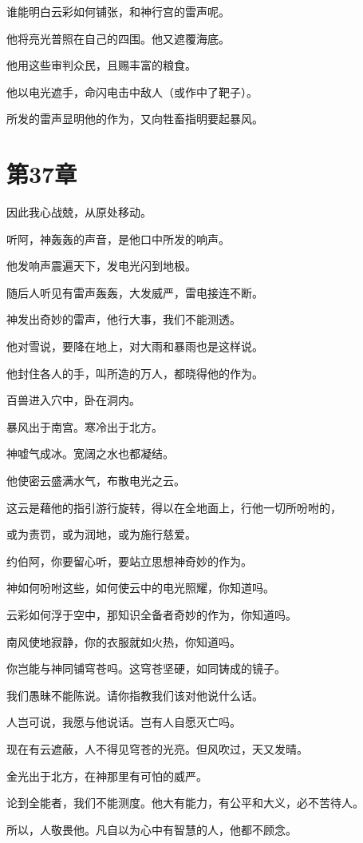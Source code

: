 \documentclass[12pt,oneside]{book}
\begin{document}
谁能明白云彩如何铺张，和神行宫的雷声呢。

他将亮光普照在自己的四围。他又遮覆海底。

他用这些审判众民，且赐丰富的粮食。

他以电光遮手，命闪电击中敌人（或作中了靶子）。

所发的雷声显明他的作为，又向牲畜指明要起暴风。


\chapter{第37章}
因此我心战兢，从原处移动。

听阿，神轰轰的声音，是他口中所发的响声。

他发响声震遍天下，发电光闪到地极。

随后人听见有雷声轰轰，大发威严，雷电接连不断。

神发出奇妙的雷声，他行大事，我们不能测透。

他对雪说，要降在地上，对大雨和暴雨也是这样说。

他封住各人的手，叫所造的万人，都晓得他的作为。

百兽进入穴中，卧在洞内。

暴风出于南宫。寒冷出于北方。

神嘘气成冰。宽阔之水也都凝结。

他使密云盛满水气，布散电光之云。

这云是藉他的指引游行旋转，得以在全地面上，行他一切所吩咐的，

或为责罚，或为润地，或为施行慈爱。

约伯阿，你要留心听，要站立思想神奇妙的作为。

神如何吩咐这些，如何使云中的电光照耀，你知道吗。

云彩如何浮于空中，那知识全备者奇妙的作为，你知道吗。

南风使地寂静，你的衣服就如火热，你知道吗。

你岂能与神同铺穹苍吗。这穹苍坚硬，如同铸成的镜子。

我们愚昧不能陈说。请你指教我们该对他说什么话。

人岂可说，我愿与他说话。岂有人自愿灭亡吗。

现在有云遮蔽，人不得见穹苍的光亮。但风吹过，天又发晴。

金光出于北方，在神那里有可怕的威严。

论到全能者，我们不能测度。他大有能力，有公平和大义，必不苦待人。

所以，人敬畏他。凡自以为心中有智慧的人，他都不顾念。
\end{document}
